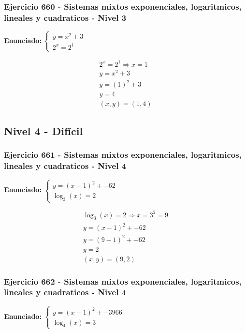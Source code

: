 \documentclass[12pt,a4paper]{article}
\begin{document}
\subsubsection*{Ejercicio 660 - Sistemas mixtos exponenciales, logaritmicos, lineales y cuadraticos - Nivel 3}
\textbf{Enunciado:} \(\begin{cases} y=x^2+3\\ 2^x=2^{1}\end{cases}\)

\[
\begin{aligned}
2^x=2^{1}\Rightarrow x=1\\
y=x^2+3\\
y=(1)^2+3\\
y=4\\
\boxed{(x,y)=(1,4)}
\end{aligned}
\]


\newpage

\subsection*{Nivel 4 - Difícil}

\subsubsection*{Ejercicio 661 - Sistemas mixtos exponenciales, logaritmicos, lineales y cuadraticos - Nivel 4}
\textbf{Enunciado:} \(\begin{cases} y=(x-1)^2+-62\\ \log_{3}\left(x\right)=2\end{cases}\)

\[
\begin{aligned}
\log_{3}\left(x\right)=2\Rightarrow x=3^{2}=9\\
y=(x-1)^2+-62\\
y=(9-1)^2+-62\\
y=2\\
\boxed{(x,y)=(9,2)}
\end{aligned}
\]


\subsubsection*{Ejercicio 662 - Sistemas mixtos exponenciales, logaritmicos, lineales y cuadraticos - Nivel 4}
\textbf{Enunciado:} \(\begin{cases} y=(x-1)^2+-3966\\ \log_{4}\left(x\right)=3\end{cases}\)
\end{document}
